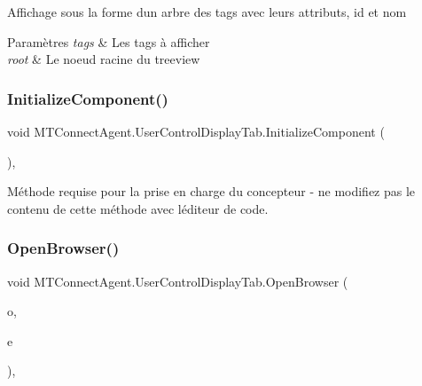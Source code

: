 Affichage sous la forme d\textquotesingle{}un arbre des tags avec leurs attributs, id et nom 


\begin{DoxyParams}{Paramètres}
{\em tags} & Les tags à afficher\\
\hline
{\em root} & Le noeud racine du treeview\\
\hline
\end{DoxyParams}
\mbox{\label{class_m_t_connect_agent_1_1_user_control_display_tab_a7280eefa02218d37616dadb3c0e01136}} 
\subsubsection{\texorpdfstring{Initialize\+Component()}{InitializeComponent()}}
{\footnotesize\ttfamily void M\+T\+Connect\+Agent.\+User\+Control\+Display\+Tab.\+Initialize\+Component (\begin{DoxyParamCaption}{ }\end{DoxyParamCaption})\hspace{0.3cm}{\ttfamily [inline]}, {\ttfamily [private]}}



Méthode requise pour la prise en charge du concepteur -\/ ne modifiez pas le contenu de cette méthode avec l\textquotesingle{}éditeur de code. 

\mbox{\label{class_m_t_connect_agent_1_1_user_control_display_tab_a35c3095a47ee602da98eca8e77e6ff3b}} 
\subsubsection{\texorpdfstring{Open\+Browser()}{OpenBrowser()}}
{\footnotesize\ttfamily void M\+T\+Connect\+Agent.\+User\+Control\+Display\+Tab.\+Open\+Browser (\begin{DoxyParamCaption}\item[{object}]{o,  }\item[{Mouse\+Event\+Args}]{e }\end{DoxyParamCaption})\hspace{0.3cm}{\ttfamily [inline]}, {\ttfamily [private]}}



